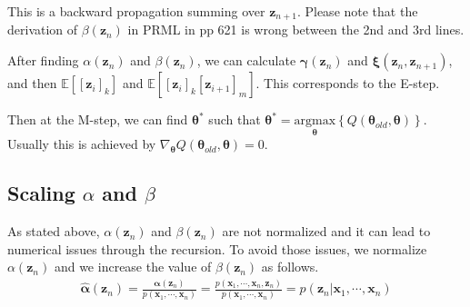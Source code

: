 \documentclass[a4]{article}
\begin{document}
This is a backward propagation summing over $\bm{z}_{n+1}$.
Please note that the derivation of $\beta(\bm{z}_n)$ in PRML \cite{bishop2007}
in pp 621 is wrong between the 2nd and 3rd lines.

After finding $\alpha(\bm{z}_n)$ and $\beta(\bm{z}_n)$, we can calculate 
$\bm{\gamma}(\bm{z}_n)$ and $\bm{\xi}(\bm{z}_n, \bm{z}_{n+1})$, and then
$\mathbb{E}\left[[\bm{z}_i]_k\right]$ and $\mathbb{E}\left[[\bm{z}_i]_k [\bm{z}_{i+1}]_m\right]$.
This corresponds to the E-step.

Then at the M-step, we can find $\bm{\theta}^*$ such that
$\bm{\theta}^* = \underset{\bm{\theta}}{\mathrm{argmax}} \left\{Q(\bm{\theta}_{old}, \bm{\theta})\right\}$.
Usually this is achieved by $\nabla_{\bm{\theta}}Q(\bm{\theta}_{old}, \bm{\theta}) = 0$.

\subsection{Scaling $\alpha$ and $\beta$}

As stated above, $\alpha(\bm{z}_n)$ and $\beta(\bm{z}_n)$ are not normalized and it can lead to numerical issues through the recursion.
To avoid those issues, we normalize  $\alpha(\bm{z}_n)$ and we increase the value of $\beta(\bm{z}_n)$ as follows.
\begin{equation}
\begin{aligned}
    \bm{\hat{\alpha}}(\bm{z}_n) = \frac{
        \bm{\alpha}(\bm{z}_n)
    }
    {
        p( \bm{x}_1, \cdots, \bm{x}_n )
    }
    = \frac{
        p( \bm{x}_1, \cdots, \bm{x}_n , \bm{z}_n )
    }
    {
        p( \bm{x}_1, \cdots, \bm{x}_n )
    }
    =
        p( \bm{z}_n | \bm{x}_1, \cdots, \bm{x}_n )
\end{aligned}
\end{equation}
\end{document}

